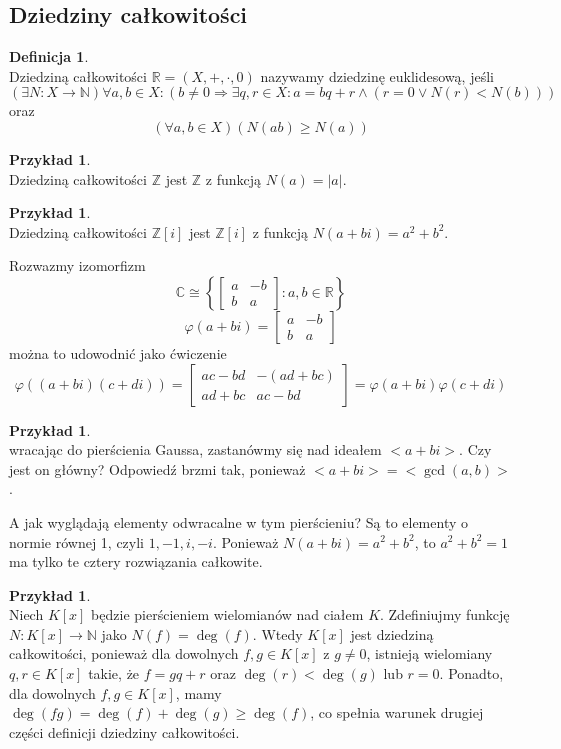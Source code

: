 \documentclass[11pt,a4paper]{article}
\theoremstyle{definition}
\newtheorem{definicja}[twierdzenie]{Definicja}
\newtheorem{przyklad}[twierdzenie]{Przykład}
\theoremstyle{remark}
\begin{document}
\subsection{Dziedziny całkowitości}
\begin{definicja}~\\
Dziedziną całkowitości $\mathbb{R} = (X, +, \cdot, 0)$ nazywamy dziedzinę euklidesową, jeśli
\[
    (\exists N: X \rightarrow \mathbb{N}) \forall a, b \in X: (b \neq 0 \Rightarrow \exists q, r \in X: a = bq + r \land (r = 0 \lor N(r) < N(b)))
\]
oraz
\[
    (\forall a, b \in X) (N(ab) \geq N(a))
\]
\end{definicja}
\begin{przyklad}~\\
    Dziedziną całkowitości $\mathbb{Z}$ jest $\mathbb{Z}$ z funkcją $N(a) = |a|$.
\end{przyklad}
\begin{przyklad}~\\
    Dziedziną całkowitości $\mathbb{Z}[i]$ jest $\mathbb{Z}[i]$ z funkcją $N(a + bi) = a^2 + b^2$.
\end{przyklad}
Rozwazmy izomorfizm 
\[
    \mathbb{C} \cong \left\{\begin{bmatrix}a & -b \\ b & a
\end{bmatrix} : a, b \in \mathbb{R}\right\}
        \]
        \[
    \varphi(a + bi) = \begin{bmatrix}a & -b \\ b & a
\end{bmatrix}
\]
można to udowodnić jako ćwiczenie
\[
    \varphi((a + bi)(c + di)) = \begin{bmatrix}ac - bd & -(ad + bc) \\ ad + bc & ac - bd\end{bmatrix} = \varphi(a + bi)\varphi(c + di)
\]
\begin{przyklad}~\\
    wracając do pierścienia Gaussa, zastanówmy się nad ideałem $<a + bi>$. Czy jest on główny? Odpowiedź brzmi tak, ponieważ $<a + bi> = <\gcd(a, b)>$.
\end{przyklad}
A jak wyglądają elementy odwracalne w tym pierścieniu? Są to elementy o normie równej 1, czyli $1, -1, i, -i$. Ponieważ $N(a + bi) = a^2 + b^2$, to $a^2 + b^2 = 1$ ma tylko te cztery rozwiązania całkowite.
\begin{przyklad}~\\
    Niech $K[x]$ będzie pierścieniem wielomianów nad ciałem $K$. Zdefiniujmy funkcję $N: K[x] \rightarrow \mathbb{N}$ jako $N(f) = \deg(f)$. Wtedy $K[x]$ jest dziedziną całkowitości, ponieważ dla dowolnych $f, g \in K[x]$ z $g \neq 0$, istnieją wielomiany $q, r \in K[x]$ takie, że $f = gq + r$ oraz $\deg(r) < \deg(g)$ lub $r = 0$. Ponadto, dla dowolnych $f, g \in K[x]$, mamy $\deg(fg) = \deg(f) + \deg(g) \geq \deg(f)$, co spełnia warunek drugiej części definicji dziedziny całkowitości.
\end{przyklad}
\end{document}

